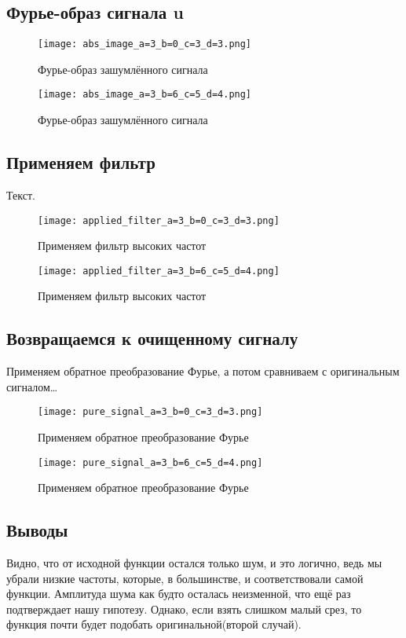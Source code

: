 \newpage
\subsection{Фурье-образ сигнала u}


\begin{figure}[ht]
    \centering
    \texttt{[image: abs\_image\_a=3\_b=0\_c=3\_d=3.png]}
    \caption{Фурье-образ зашумлённого сигнала}
\end{figure}

\begin{figure}[ht]
    \centering
    \texttt{[image: abs\_image\_a=3\_b=6\_c=5\_d=4.png]}
    \caption{Фурье-образ зашумлённого сигнала}
\end{figure}


\newpage
\subsection{Применяем фильтр}
Текст.
\begin{figure}[ht]
    \centering
    \texttt{[image: applied\_filter\_a=3\_b=0\_c=3\_d=3.png]}
    \caption{Применяем фильтр высоких частот}
\end{figure}

\begin{figure}[ht]
    \centering
    \texttt{[image: applied\_filter\_a=3\_b=6\_c=5\_d=4.png]}
    \caption{Применяем фильтр высоких частот}
\end{figure}

\newpage
\newpage
\subsection{Возвращаемся к очищенному сигналу}
Применяем обратное преобразование Фурье, а потом сравниваем с оригинальным сигналом\dots

\begin{figure}[ht]
    \centering
    \texttt{[image: pure\_signal\_a=3\_b=0\_c=3\_d=3.png]}
    \caption{Применяем обратное преобразование Фурье}
\end{figure}

\begin{figure}[ht]
    \centering
    \texttt{[image: pure\_signal\_a=3\_b=6\_c=5\_d=4.png]}
    \caption{Применяем обратное преобразование Фурье}
\end{figure}

\newpage
\subsection{Выводы}
Видно, что от исходной функции остался только шум, и это логично, ведь мы убрали низкие частоты, которые, в большинстве, 
и соответствовали самой функции. Амплитуда шума как будто осталась неизменной, что ещё раз подтверждает нашу гипотезу. Однако, если взять слишком малый срез, то функция почти будет подобать оригинальной(второй случай).

\endinput
